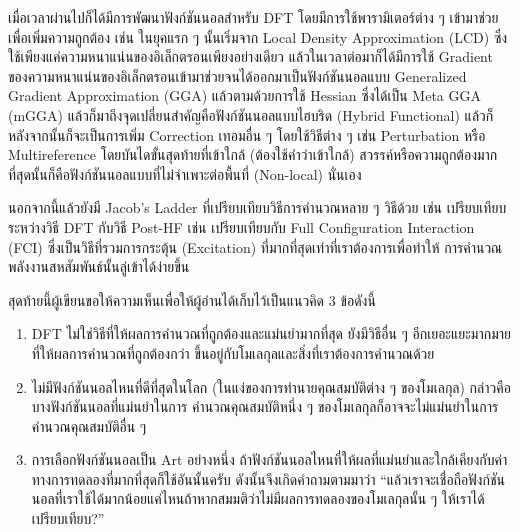 เมื่อเวลาผ่านไปก็ได้มีการพัฒนาฟังก์ชันนอลสำหรับ DFT โดยมีการใช้พารามิเตอร์ต่าง ๆ เข้ามาช่วยเพื่อเพิ่มความถูกต้อง เช่น ในยุคแรก ๆ นั้นเริ่มจาก 
Local Density Approximation (LCD) ซึ่งใช้เพียงแค่ความหนาแน่นของอิเล็กตรอนเพียงอย่างเดียว แล้วในเวลาต่อมาก็ได้มีการใช้ Gradient 
ของความหนาแน่นของอิเล็กตรอนเข้ามาช่วยจนได้ออกมาเป็นฟังก์ชันนอลแบบ Generalized Gradient Approximation (GGA)\autocite{perdew1996}
แล้วตามด้วยการใช้ Hessian ซึ่งได้เป็น Meta GGA (mGGA) แล้วก็มาถึงจุดเปลี่ยนสำคัญคือฟังก์ชันนอลแบบไฮบริด (Hybrid Functional) 
แล้วก็หลังจากนั้นก็จะเป็นการเพิ่ม Correction เทอมอื่น ๆ โดยใช้วิธีต่าง ๆ เช่น Perturbation หรือ Multireference โดยบันไดขั้นสุดท้ายที่เข้าใกล้ 
(ต้องใช้คำว่าเข้าใกล้) สวรรค์หรือความถูกต้องมากที่สุดนั้นก็คือฟังก์ชันนอลแบบที่ไม่จำเพาะต่อพื้นที่ (Non-local) นั่นเอง 

นอกจากนี้แล้วยังมี Jacob's Ladder ที่เปรียบเทียบวิธีการคำนวณหลาย ๆ วิธีด้วย เช่น เปรียบเทียบระหว่างวิธี DFT กับวิธี Post-HF เช่น 
เปรียบเทียบกับ Full Configuration Interaction (FCI) ซึ่งเป็นวิธีที่รวมการกระตุ้น (Excitation) ที่มากที่สุดเท่าที่เราต้องการเพื่อทำให้%
การคำนวณพลังงานสหสัมพันธ์นั้นลู่เข้าได้ง่ายขึ้น 

สุดท้ายนี้ผู้เขียนขอให้ความเห็นเพื่อให้ผู้อ่านได้เก็บไว้เป็นแนวคิด 3 ข้อดังนี้

\begin{enumerate}[topsep=0pt]
    \item DFT ไม่ใช่วิธีที่ให้ผลการคำนวณที่ถูกต้องและแม่นยำมากที่สุด ยังมีวิธีอื่น ๆ อีกเยอะแยะมากมายที่ให้ผลการคำนวณที่ถูกต้องกว่า 
    ขึ้นอยู่กับโมเลกุลและสิ่งที่เราต้องการคำนวณด้วย
    
    \item ไม่มีฟังก์ชันนอลไหนที่ดีที่สุดในโลก (ในแง่ของการทำนายคุณสมบัติต่าง ๆ ของโมเลกุล) กล่าวคือบางฟังก์ชันนอลที่แม่นยำในการ%
    คำนวณคุณสมบัติหนึ่ง ๆ ของโมเลกุลก็อาจจะไม่แม่นยำในการคำนวณคุณสมบัติอื่น ๆ

    \item การเลือกฟังก์ชันนอลเป็น Art อย่างหนึ่ง ถ้าฟังก์ชันนอลไหนที่ให้ผลที่แม่นยำและใกล้เคียงกับค่าทางการทดลองที่มากที่สุดก็ใช้อันนั้นครับ 
    ดังนั้นจึงเกิดคำถามตามมาว่า \enquote{แล้วเราจะเชื่อถือฟังก์ชันนอลที่เราใช้ได้มากน้อยแค่ไหนถ้าหากสมมติว่าไม่มีผลการทดลองของโมเลกุลนั้น ๆ 
    ให้เราได้เปรียบเทียบ?}
\end{enumerate}
